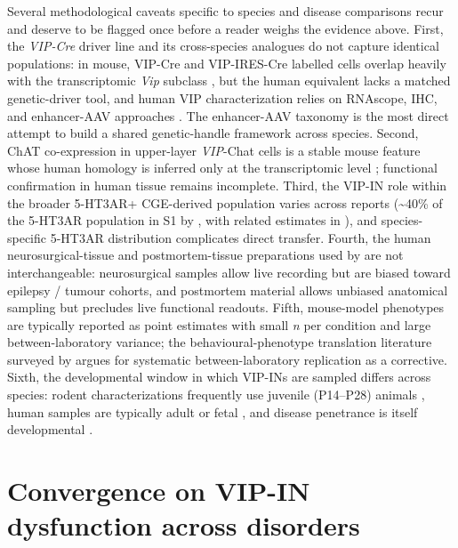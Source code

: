 \documentclass[11pt]{article}
\begin{document}
Several methodological caveats specific to species and disease comparisons
recur and deserve to be flagged once before a reader weighs the evidence
above. First, the \textit{VIP-Cre} driver line and its cross-species analogues
do not capture identical populations: in mouse, VIP-Cre and VIP-IRES-Cre
labelled cells overlap heavily with the transcriptomic \textit{Vip} subclass
\citep{Tasic2018, Yao2023, Tasic2016}, but the human equivalent lacks a
matched genetic-driver tool, and human VIP characterization relies on
RNAscope, IHC, and enhancer-AAV approaches
\citep{Teymornejad2024a, Lee2023a}. The
\citet{Lee2023a} enhancer-AAV taxonomy is the most direct attempt to
build a shared genetic-handle framework across species. Second, ChAT
co-expression in upper-layer \textit{VIP}-Chat cells is a stable mouse feature
\citep{Tasic2016, Tasic2018, Tremblay2016, Yao2023} whose human homology is
inferred only at the transcriptomic level
\citep{Hodge2019, Lee2023a}; functional confirmation in human tissue
remains incomplete. Third, the VIP-IN role within the broader 5-HT3AR+
CGE-derived population varies across reports ({\textasciitilde}40\% of the 5-HT3AR
population in S1 by \citet{Rudy2011}, with related estimates in
), and species-specific 5-HT3AR
distribution complicates direct transfer. Fourth, the human
neurosurgical-tissue and postmortem-tissue preparations used by
\citep{Somogyi2025, Boldog2018, Hodge2019, Lee2023a} are
not interchangeable: neurosurgical samples allow live recording but are
biased toward epilepsy / tumour cohorts, and postmortem material allows
unbiased anatomical sampling but precludes live functional readouts.
Fifth, mouse-model phenotypes are typically reported as point estimates
with small \textit{n} per condition and large between-laboratory variance; the
behavioural-phenotype translation literature surveyed by
argues for systematic between-laboratory replication
as a corrective. Sixth, the developmental window in which VIP-INs are
sampled differs across species: rodent characterizations frequently
use juvenile (P14--P28) animals
\citep{Mossner2020, Bhandari2024, Mcfarlan2024a},
human samples are typically adult or fetal
\citep{Lattke2026, Hodge2019, Lake2018}, and disease
penetrance is itself developmental
\citep{Mossner2020, Chen2023b, Lattke2026, Vormsteinschneider2020, Simacek2025b}.

\section{Convergence on VIP-IN dysfunction across disorders}
\end{document}
